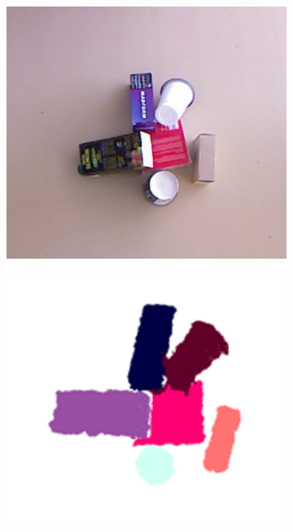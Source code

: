 \begin{figure}[tb]
\centering
\begin{subfigure}[t]{0.2\textwidth}
\centering
\includegraphics[width=\textwidth]{Img/ObjectSegmentation/seg1_rgb.png}
\end{subfigure}
\begin{subfigure}[t]{0.2\textwidth}
\centering
\includegraphics[width=\textwidth]{Img/ObjectSegmentation/seg1.png}

\end{subfigure}
\end{figure}
